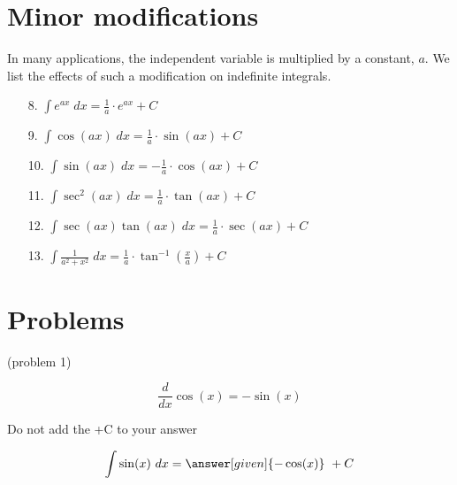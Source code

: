 \documentclass{ximera}
\begin{document}
\section{Minor modifications}

In many applications, the independent variable is multiplied by a constant, $a$. 
We list the effects of such a modification on indefinite integrals.

\begin{enumerate}

\item[8.] $\displaystyle{\int e^{ax} \; dx = \frac{1}{a} \cdot e^{ax} + C}$


\item[9.] $\displaystyle{\int \cos(ax) \; dx = \frac{1}{a} \cdot \sin(ax) + C}$

\item[10.] $\displaystyle{\int \sin(ax) \; dx = -\frac{1}{a} \cdot \cos(ax) + C}$

\item[11.] $\displaystyle{\int \sec^2(ax) \; dx = \frac{1}{a} \cdot \tan(ax) + C}$

\item[12.] $\displaystyle{\int \sec(ax)\tan(ax) \; dx = \frac{1}{a} \cdot \sec(ax) + C}$

\item[13.] $\displaystyle{\int \frac{1}{a^2 + x^2} \; dx = \frac{1}{a} \cdot \tan^{-1}\left(\frac{x}{a}\right) + C}$

\end{enumerate}



\section{Problems}






\begin{problem}(problem 1)

\begin{hint}
\[
\frac{d}{dx} \cos(x) = -\sin(x)
\]
\end{hint}
\begin{hint}
\begin{center}
Do not add the +C to your answer
\end{center}
\end{hint}

\[
\int \sin(x) \ dx =
\answer[given]{-\cos(x)} \ + C
\]
\end{problem}
\end{document}
